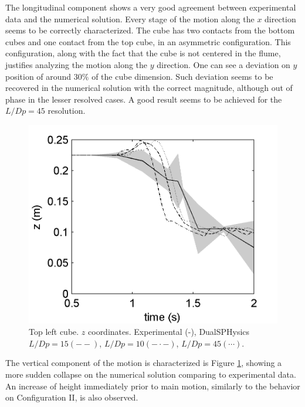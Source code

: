 The longitudinal component shows a very good agreement between experimental data and the numerical solution. Every stage of the motion along the $x$ direction seems to be correctly characterized. The cube has two contacts from the bottom cubes and one contact from the top cube, in an asymmetric configuration. This configuration, along with the fact that the cube is not centered in the flume, justifies analyzing the motion along the $y$ direction. One can see a deviation on $y$ position of around $30\%$ of the cube dimension. Such deviation seems to be recovered in the numerical solution with the correct magnitude, although out of phase in the lesser resolved cases. A good result seems to be achieved for the $L/Dp=45$ resolution.
%
\begin{figure}[ht!]
	\centering 

	\includegraphics[width=0.45\linewidth]{Figures/5.Chapter/Fig_9}
	\caption{Top left cube. $z$ coordinates. Experimental (-), DualSPHysics $L/Dp=15 (- -)$, $L/Dp=10 (- \cdot -)$, $L/Dp=45 (\cdots)$.}
	\label{fig:cube5_z} 
\end{figure}
%
The vertical component of the motion is characterized is Figure \ref{fig:cube5_z}, showing a more sudden collapse on the numerical solution comparing to experimental data. An increase of height immediately prior to main motion, similarly to the behavior on Configuration II, is also observed.

